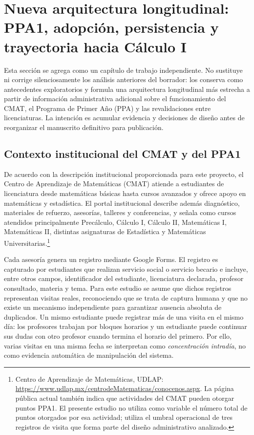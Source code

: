 \clearpage
\section{Nueva arquitectura longitudinal: PPA1, adopción, persistencia y trayectoria hacia Cálculo I}
\label{sec:ppa_progression_v8}

Esta sección se agrega como un capítulo de trabajo independiente. No sustituye ni corrige silenciosamente los análisis anteriores del borrador: los conserva como antecedentes exploratorios y formula una arquitectura longitudinal más estrecha a partir de información administrativa adicional sobre el funcionamiento del CMAT, el Programa de Primer Año (PPA) y las revalidaciones entre licenciaturas. La intención es acumular evidencia y decisiones de diseño antes de reorganizar el manuscrito definitivo para publicación.

\subsection{Contexto institucional del CMAT y del PPA1}

De acuerdo con la descripción institucional proporcionada para este proyecto, el Centro de Aprendizaje de Matemáticas (CMAT) atiende a estudiantes de licenciatura desde matemáticas básicas hasta cursos avanzados y ofrece apoyo en matemáticas y estadística. El portal institucional describe además diagnóstico, materiales de refuerzo, asesorías, talleres y conferencias, y señala como cursos atendidos principalmente Precálculo, Cálculo I, Cálculo II, Matemáticas I, Matemáticas II, distintas asignaturas de Estadística y Matemáticas Universitarias.\footnote{Centro de Aprendizaje de Matemáticas, UDLAP: \url{https://www.udlap.mx/centrodeMatematicas/conocenos.aspx}. La página pública actual también indica que actividades del CMAT pueden otorgar puntos PPA1. El presente estudio no utiliza como variable el número total de puntos otorgados por esa actividad; utiliza el umbral operacional de tres registros de visita que forma parte del diseño administrativo analizado.}

Cada asesoría genera un registro mediante Google Forms. El registro es capturado por estudiantes que realizan servicio social o servicio becario e incluye, entre otros campos, identificador del estudiante, licenciatura declarada, profesor consultado, materia y tema. Para este estudio se asume que dichos registros representan visitas reales, reconociendo que se trata de captura humana y que no existe un mecanismo independiente para garantizar ausencia absoluta de duplicados. Un mismo estudiante puede registrar más de una visita en el mismo día: los profesores trabajan por bloques horarios y un estudiante puede continuar sus dudas con otro profesor cuando termina el horario del primero. Por ello, varias visitas en una misma fecha se interpretan como \emph{concentración intradía}, no como evidencia automática de manipulación del sistema.

